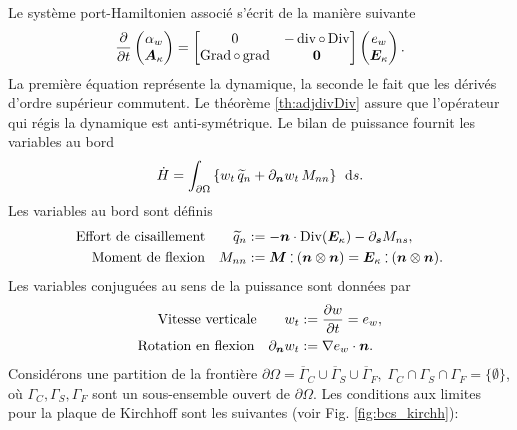 Le système port-Hamiltonien associé s'écrit de la manière suivante
\begin{equation*}
\diffp{}{t}
\begin{pmatrix}
\alpha_w \\
\bm{A}_{\kappa} \\
\end{pmatrix} = 
\begin{bmatrix}
0  &  - \div \circ \Div \\
\Grad \circ \grad & \bm{0} \\
\end{bmatrix}
\begin{pmatrix}
e_w \\
\bm{E}_{\kappa} \\
\end{pmatrix}.
\end{equation*}
La première équation représente la dynamique, la seconde le fait que les dérivés d'ordre supérieur commutent. Le théorème \ref{th:adjdivDiv} assure que l'opérateur qui régis la dynamique est anti-symétrique. Le bilan de puissance fournit les variables au bord
\begin{equation*}
\dot{H} = \int_{\partial \Omega} \left\{ w_t \, \widetilde{q}_n + \partial_{\bm{n}}{w_t} \, M_{nn}\right\} \, \d{s}.
\end{equation*} 
Les variables au bord sont définis 
\begin{equation*}
	\begin{aligned}
	\text{Effort de cisaillement}  \qquad \widetilde{q}_{n} &:= - \bm{n} \cdot \mathrm{Div}(\bm{E}_{\kappa}) - \partial_{\bm{s}}{M_{ns}}, \\
	\text{Moment de flexion} \quad M_{nn} &:=  \bm{M} \cddot (\bm{n}\otimes{\bm{n}}) = \bm{E}_{\kappa} \cddot (\bm{n}\otimes{\bm{n}}).
	\end{aligned}
\end{equation*}
Les variables conjuguées au sens de la puissance sont données par
\begin{equation*}
	\begin{aligned}
	\text{Vitesse verticale}  \qquad w_t &:= \diffp{w}{t} = e_w, \\
	\text{Rotation en flexion} \quad 
	\partial_{\bm{n}}{w_t} &:= \nabla{e_w} \cdot \bm{n}.
	\end{aligned}
\end{equation*}
Considérons une partition de la frontière $ \partial \Omega = \overline{\Gamma}_{C} \cup \overline{\Gamma}_{S} \cup \overline {\Gamma}_{F}, \; {\Gamma}_{C} \cap {\Gamma}_{S} \cap {\Gamma}_{F} = \{\emptyset\} $, où $ {\Gamma}_{C}, {\Gamma}_{S}, {\Gamma}_{F} $ sont un sous-ensemble ouvert de $\partial \Omega $. Les conditions aux limites pour la plaque de Kirchhoff \cite{gustafsson2018} sont les suivantes (voir Fig. \ref{fig:bcs_kirchh}):
